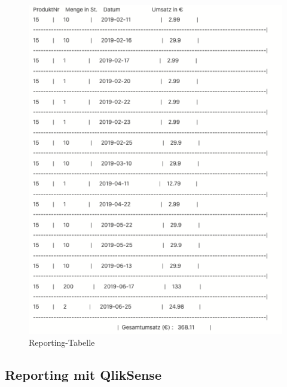 \begin{figure}[ht!]
  \centering
  \includegraphics[width=1.1\linewidth]{pictures/report_sql.png}
  \caption{Reporting-Tabelle}
  \label{report_sql}
\end{figure}

\subsection{Reporting mit QlikSense}

\textcolor{red}{\blindtext}

\newpage

